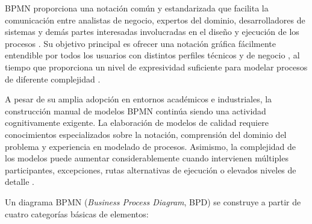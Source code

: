 BPMN  proporciona una notación común  y estandarizada que facilita la comunicación entre analistas de negocio, expertos del dominio, desarrolladores de sistemas y demás partes interesadas involucradas en el diseño y ejecución de los  procesos  \cite{omg2011bpmn, dumas2018fundamentals}. Su objetivo principal es ofrecer una notación gráfica fácilmente entendible por todos los usuarios  con distintos perfiles técnicos y de negocio , al tiempo que proporciona un nivel de expresividad suficiente para modelar procesos de diferente complejidad \cite{dumas2018fundamentals}.

A pesar de su amplia adopción en entornos académicos e industriales, la construcción manual de modelos BPMN continúa siendo una actividad cognitivamente exigente. La elaboración de modelos de calidad requiere conocimientos especializados sobre la notación, comprensión del dominio del problema y experiencia en modelado de procesos. Asimismo, la complejidad de los modelos puede aumentar considerablemente cuando intervienen múltiples participantes, excepciones, rutas alternativas de ejecución o elevados niveles de detalle \cite{dumas2018fundamentals, mendling2010}.

Un diagrama BPMN (\textit{Business Process Diagram}, BPD) se construye a partir de cuatro categorías básicas de elementos:

